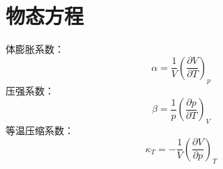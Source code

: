 \section{物态方程}


体膨胀系数：
$$\alpha = \frac{1}{V}\left( \frac{\partial V}{\partial T}\right)_{p} $$
压强系数：
$$\beta = \frac{1}{p}\left( \frac{\partial p}{\partial T}\right)_{V} $$
等温压缩系数：
$$\kappa_{T} = - \frac{1}{V}\left( \frac{\partial V}{\partial p}\right)_{T}$$

